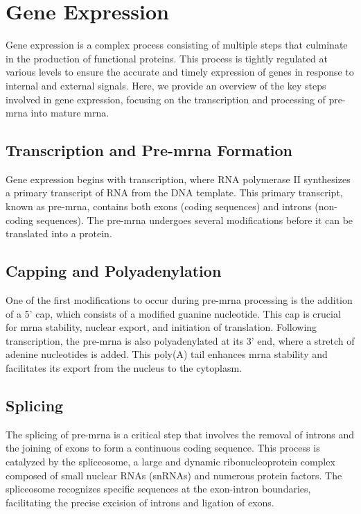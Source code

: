 \section{Gene Expression}
\label{sec:gene_expression}

Gene expression is a complex process consisting of multiple steps that
culminate in the production of functional proteins.
This process is tightly regulated at various levels to ensure the accurate and
timely expression of genes in response to internal and external signals.
Here, we provide an overview of the key steps involved in gene expression,
focusing on the transcription and processing of pre-\gls{mrna} into mature \gls{mrna}.

\subsection{Transcription and Pre-\gls{mrna} Formation}
Gene expression begins with transcription, where RNA polymerase II synthesizes
a primary transcript of RNA from the DNA template.
This primary transcript, known as pre-\gls{mrna}, contains both exons (coding
sequences) and introns (non-coding sequences)\supercite{lee_mechanisms_2015}.
The pre-\gls{mrna} undergoes several modifications before it can be translated into a
protein.

\subsection{Capping and Polyadenylation}
One of the first modifications to occur during pre-\gls{mrna} processing is the
addition of a 5' cap, which consists of a modified guanine nucleotide.
This cap is crucial for \gls{mrna} stability, nuclear export, and initiation of
translation\supercite{topisirovic_cap_2011}.
Following transcription, the pre-\gls{mrna} is also polyadenylated at its 3' end,
where a stretch of adenine nucleotides is added.
This poly(A) tail enhances \gls{mrna} stability and facilitates its export from the
nucleus to the cytoplasm\supercite{passmore_roles_2022}.

\subsection{Splicing}
The splicing of pre-\gls{mrna} is a critical step that involves the removal of
introns and the joining of exons to form a continuous coding sequence.
This process is catalyzed by the spliceosome, a large and dynamic
ribonucleoprotein complex composed of small nuclear RNAs (snRNAs) and numerous
protein factors\supercite{lee_mechanisms_2015}.
The spliceosome recognizes specific sequences at the exon-intron boundaries,
facilitating the precise excision of introns and ligation of
exons\supercite{wang_splicing_2008}.

